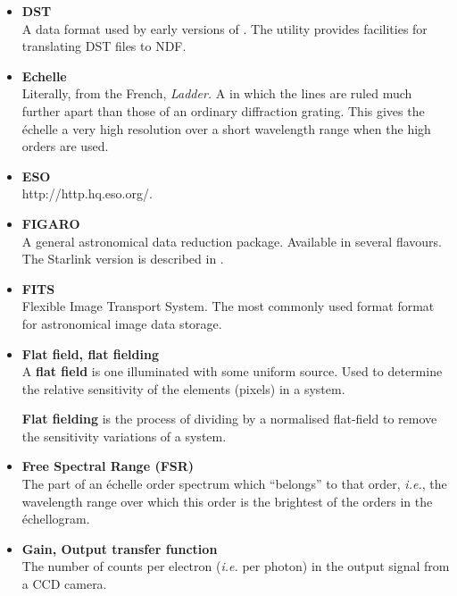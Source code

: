 \begin{itemize}
\item {\bf\label{gl_dst}DST}\\
      A data format used by early versions of \@.
      The  utility provides facilities for
      translating DST files to NDF.

\item {\bf\label{gl_echelle}Echelle}\\
      Literally, from the French, {\sl Ladder.}
      A  in which the
      lines are ruled much further apart than those of an ordinary
      diffraction grating.  This gives the \'{e}chelle a very high
      resolution over a short wavelength range when the high orders are
      used.

\item {\bf\label{gl_eso}ESO}\\
      {http://http.hq.eso.org/}.

\item {\bf\label{gl_figaro}FIGARO}\\
      A general astronomical data reduction package.  Available in
      several flavours.  The Starlink version is described in
      .

\item {\bf\label{gl_fits}FITS}\\
      Flexible Image Transport System.  The most commonly used format
      format for astronomical image data storage.

\item {\bf\label{gl_flat_field}Flat field, flat fielding}\\
      A {\bf flat field} is one illuminated with some uniform source.
      Used to determine the relative sensitivity of the elements
      (pixels) in a system.

      {\bf Flat fielding} is the process of dividing by a normalised
      flat-field to remove the sensitivity variations of a system.

\item {\bf\label{gl_fsr}Free Spectral Range (FSR)}\\
      The part of an \'{e}chelle order spectrum which ``belongs'' to that
      order, {\it{i.e.}}, the wavelength range over which this order is the
      brightest of the orders in the \'{e}chellogram.

\item {\bf\label{gl_ccd_gain}Gain, Output transfer function}\\
      The number of 
      counts per electron ({\it{i.e.}} per photon)
      in the output signal from a CCD camera.


\end{itemize}
